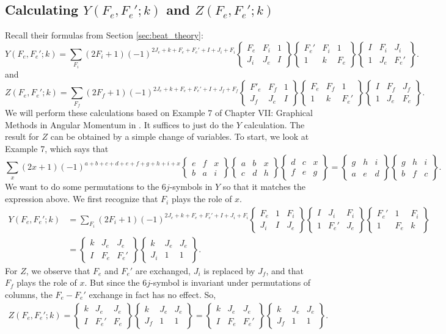 \documentclass[11pt]{article}
\newcommand{\Gj}[6]{ \begin{Bmatrix}
		#1 & #2 & #3 \\
		#4 & #5 & #6 
\end{Bmatrix}}
\begin{document}
\begin{appendices}
\subsection{Calculating $Y(F_e, F_e';k)$ and $Z(F_e, F_e';k)$} \label{app:YZ}
Recall their formulas from Section \ref{sec:beat_theory}:
\begin{equation*}
Y(F_e, F_e';k) = \sum_{F_i}(2F_i + 1)(-1)^{2J_e + k + F_e + F_e' + I + J_i + F_i}
\Gj{F_e}{F_i}{1}{J_i}{J_e}{I}
\Gj{F_e'}{F_i}{1}{1}{k}{F_e}
\Gj{I}{F_i}{J_i}{1}{J_e}{F_e'}.
\end{equation*}
and
\begin{equation*}
Z(F_e, F_e';k) = \sum_{F_f}(2F_f + 1)(-1)^{2J_e + k + F_e + F_e' + I + J_f + F_f}
\Gj{F'_e}{F_f}{1}{J_f}{J_e}{I}
\Gj{F_e}{F_f}{1}{1}{k}{F_e'}
\Gj{I}{F_f}{J_f}{1}{J_e}{F_e}.
\end{equation*}
We will perform these calculations based on Example 7 of Chapter VII: Graphical Methods in Angular Momentum in \cite{angular_momentum}. It suffices to just do the $Y$ calculation. The result for $Z$ can be obtained by a simple change of variables. To start, we look at Example 7, which says that
\begin{equation*}
\sum_{x}(2x+1)(-1)^{a+b+c+d+e+f+g+h+i+x}
\Gj{e}{f}{x}{b}{a}{i} 
\Gj{a}{b}{x}{c}{d}{h} 
\Gj{d}{c}{x}{f}{e}{g} 
=
\Gj{g}{h}{i}{a}{e}{d} 
\Gj{g}{h}{i}{b}{f}{c}.
\end{equation*}
We want to do some permutations to the $6j$-symbols in $Y$ so that it matches the expression above. We first recognize that $F_i$ plays the role of $x$. 
\begin{align*}
Y(F_e, F_e';k) 
&= 
\sum_{F_i}(2F_i + 1)(-1)^{2J_e + k + F_e + F_e' + I + J_i + F_i}
\Gj{F_e}{1}{F_i}{J_i}{I}{J_e}
\Gj{I}{J_i}{F_i}{1}{F_e'}{J_e}
\Gj{F_e'}{1}{F_i}{1}{F_e}{k}\\
&= 
\Gj{k}{J_e}{J_e}{I}{F_e}{F_e'} 
\Gj{k}{J_e}{J_e}{J_i}{1}{1}.
\end{align*}
For $Z$, we observe that $F_e$ and $F_e'$ are exchanged, $J_i$ is replaced by $J_f$, and that $F_f$ plays the role of $x$. But since the $6j$-symbol is invariant under permutations of columns, the $F_e - F_e'$ exchange in fact has no effect. So,
\begin{align*}
Z(F_e, F_e';k) 
= 
\Gj{k}{J_e}{J_e}{I}{F_e'}{F_e} 
\Gj{k}{J_e}{J_e}{J_f}{1}{1}
=
\Gj{k}{J_e}{J_e}{I}{F_e}{F_e'} 
\Gj{k}{J_e}{J_e}{J_f}{1}{1}.
\end{align*}


\end{appendices}
\end{document}
